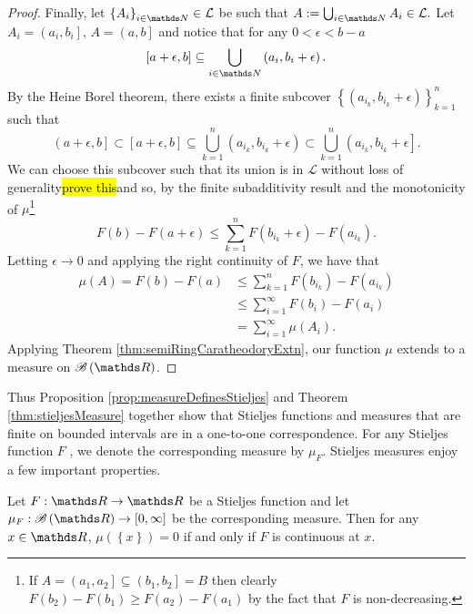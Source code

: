 \begin{proof}
Finally, let $\left\{ A_{i}\right\} _{i\in\N}\in\mathcal{L}$ be such
that $A:=\bigcup_{i\in\N}A_{i}\in\mathcal{L}.$ Let $A_{i}=\left(a_{i},b_{i}\right]$,
$A=\left(a,b\right]$ and notice that for any $0<\epsilon<b-a$ 
\[
\left[a+\epsilon,b\right]\subseteq\bigcup_{i\in\N}\left(a_{i},b_{i}+\epsilon\right).
\]
By the Heine Borel theorem, there exists a finite subcover $\left\{ \left(a_{i_{k}},b_{i_{k}}+\epsilon\right)\right\} _{k=1}^{n}$
such that
\[
\left(a+\epsilon,b\right]\subset\left[a+\epsilon,b\right]\subseteq\bigcup_{k=1}^{n}\left(a_{i_{k}},b_{i_{k}}+\epsilon\right)\subset\bigcup_{k=1}^{n}\left(a_{i_{k}},b_{i_{k}}+\epsilon\right].
\]
We can choose this subcover such that its union is in $\mathcal{L}$
without loss of generality\hl{prove this}and so, by the finite subadditivity
result and the monotonicity of $\mu$\footnote{If $A=\left(a_{1},a_{2}\right]\subseteq\left(b_{1},b_{2}\right]=B$
then clearly $F\left(b_{2}\right)-F\left(b_{1}\right)\geq F\left(a_{2}\right)-F\left(a_{1}\right)$
by the fact that $F$ is non-decreasing.}
\[
F\left(b\right)-F\left(a+\epsilon\right)\leq\sum_{k=1}^{n}F\left(b_{i_{k}}+\epsilon\right)-F\left(a_{i_{k}}\right).
\]
Letting $\epsilon\to0$ and applying the right continuity of $F$,
we have that 
\begin{align*}
\mu\left(A\right)=F\left(b\right)-F\left(a\right) & \leq\sum_{k=1}^{n}F\left(b_{i_{k}}\right)-F\left(a_{i_{k}}\right)\\
 & \leq\sum_{i=1}^{\infty}F\left(b_{i}\right)-F\left(a_{i}\right)\\
 & =\sum_{i=1}^{\infty}\mu\left(A_{i}\right).
\end{align*}
Applying Theorem \ref{thm:semiRingCaratheodoryExtn}, our function
$\mu$ extends to a measure on $\borel\left(\R\right)$.
\end{proof}
Thus Proposition \ref{prop:measureDefinesStieljes} and Theorem \ref{thm:stieljesMeasure}
together show that Stieljes functions and measures that are finite
on bounded intervals are in a one-to-one correspondence. For any Stieljes
function $F$ , we denote the corresponding measure by $\mu_{F}$.
Stieljes measures enjoy a few important properties.
\begin{prop}
\label{prop:stieljesSingleton}Let $F:\R\to\R$ be a Stieljes function
and let $\mu_{F}:\borel\left(\R\right)\to\left[0,\infty\right]$ be
the corresponding measure. Then for any $x\in\R$, $\mu\left(\left\{ x\right\} \right)=0$
if and only if $F$ is continuous at $x.$
\end{prop}

